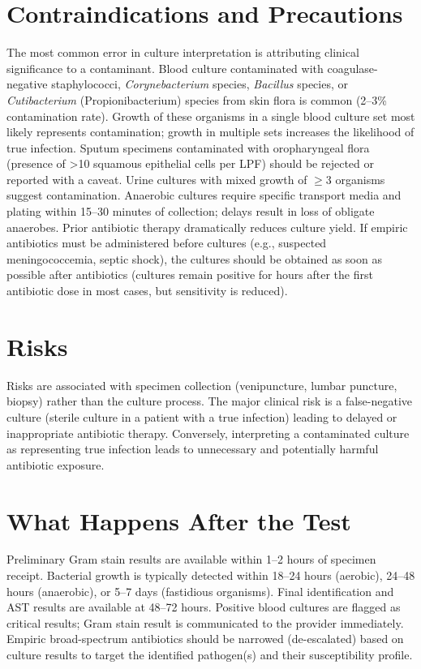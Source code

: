 \section*{Contraindications and Precautions}
The most common error in culture interpretation is attributing clinical significance to a contaminant. Blood culture contaminated with coagulase-negative staphylococci, \textit{Corynebacterium} species, \textit{Bacillus} species, or \textit{Cutibacterium} (Propionibacterium) species from skin flora is common (2--3\% contamination rate). Growth of these organisms in a single blood culture set most likely represents contamination; growth in multiple sets increases the likelihood of true infection. Sputum specimens contaminated with oropharyngeal flora (presence of >10 squamous epithelial cells per LPF) should be rejected or reported with a caveat. Urine cultures with mixed growth of $\geq$3 organisms suggest contamination. Anaerobic cultures require specific transport media and plating within 15--30 minutes of collection; delays result in loss of obligate anaerobes. Prior antibiotic therapy dramatically reduces culture yield. If empiric antibiotics must be administered before cultures (e.g., suspected meningococcemia, septic shock), the cultures should be obtained as soon as possible after antibiotics (cultures remain positive for hours after the first antibiotic dose in most cases, but sensitivity is reduced).

\section*{Risks}
Risks are associated with specimen collection (venipuncture, lumbar puncture, biopsy) rather than the culture process. The major clinical risk is a false-negative culture (sterile culture in a patient with a true infection) leading to delayed or inappropriate antibiotic therapy. Conversely, interpreting a contaminated culture as representing true infection leads to unnecessary and potentially harmful antibiotic exposure.

\section*{What Happens After the Test}
Preliminary Gram stain results are available within 1--2 hours of specimen receipt. Bacterial growth is typically detected within 18--24 hours (aerobic), 24--48 hours (anaerobic), or 5--7 days (fastidious organisms). Final identification and AST results are available at 48--72 hours. Positive blood cultures are flagged as critical results; Gram stain result is communicated to the provider immediately. Empiric broad-spectrum antibiotics should be narrowed (de-escalated) based on culture results to target the identified pathogen(s) and their susceptibility profile.

